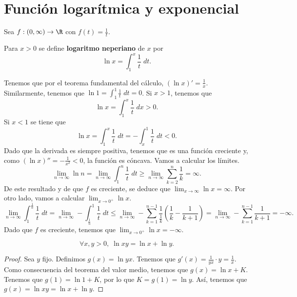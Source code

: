 \section{Función logarítmica y exponencial}
\begin{eg}
\normalfont Sea $\displaystyle f:\left(0,\infty\right)\to \R $ con $\displaystyle f\left(t\right)= \frac{1}{t} $. 
\end{eg}
\begin{fdefinition}
\normalfont Para $\displaystyle x > 0 $ se define \textbf{logaritmo neperiano} de $\displaystyle x $ por 
\[ \ln x = \int^{x}_{1} \frac{1}{t} \; dt .\]
\end{fdefinition}
\begin{observation}
\normalfont Tenemos que por el teorema fundamental del cálculo, $\displaystyle \left(\ln x\right)'= \frac{1}{x}. $ 
Similarmente, tenemos que $\displaystyle \ln 1 = \int^{1}_{1} \frac{1}{t} \; dt = 0 $. Si $\displaystyle x > 1 $, tenemos que 
\[ \ln x = \int^{x}_{1} \frac{1}{t} \; dx > 0 .\]
Si $\displaystyle x < 1 $ se tiene que 
\[ \ln x = \int^{x}_{1} \frac{1}{t} \; dt = - \int^{1}_{x} \frac{1}{t} \; dt < 0 .\]
Dado que la derivada es siempre positiva, tenemos que es una función creciente y, como $\displaystyle \left(\ln x\right)'' = - \frac{1}{x^{2}} < 0 $, la función es cóncava. Vamos a calcular los límites. 
\[ \lim_{n \to \infty} \ln n = \lim_{n \to \infty}\int^{n}_{1} \frac{1}{t} \; dt \geq \lim_{n \to \infty} \sum^{n}_{k=2}\frac{1}{k} = \infty .\]
De este resultado y de que $\displaystyle f $ es creciente, se deduce que $\displaystyle \lim_{x \to \infty}\ln x = \infty $. Por otro lado, vamos a calcular $\displaystyle \lim_{x \to 0^{+}}\ln x $. 
\[ \lim_{n \to \infty}\int^{\frac{1}{n}}_{1} \frac{1}{t} \; dt = \lim_{n \to \infty}-\int^{1}_{\frac{1}{n}} \frac{1}{t} \; dt \leq \lim_{n \to \infty}-\sum^{n-1}_{k=1}\frac{1}{\frac{1}{k}}\left(\frac{1}{k}-\frac{1}{k+1}\right) = \lim_{n \to \infty}-\sum^{n-1}_{k=1}\frac{1}{k+1} = - \infty .\]
Dado que $\displaystyle f $ es creciente, tenemos que $\displaystyle \lim_{x \to 0^{+}}\ln x = -\infty $.
\end{observation}
\begin{ftheorem}[]
\normalfont 
\[ \forall x,y > 0, \;\ln xy = \ln x + \ln y.\]
\end{ftheorem}
\begin{proof}
Sea $\displaystyle y $ fijo. Definimos $\displaystyle g\left(x\right) = \ln yx $. Tenemos que $\displaystyle g'\left(x\right) = \frac{1}{yx} \cdot y = \frac{1}{x} $. Como consecuencia del teorema del valor medio, tenemos que $\displaystyle g\left(x\right) = \ln x + K $. Tenemos que $\displaystyle g\left(1\right) = \ln 1 + K $, por lo que $\displaystyle K = g\left(1\right) = \ln y$. 
Así, tenemos que $\displaystyle g\left(x\right) = \ln xy = \ln x + \ln y $.
\end{proof}
